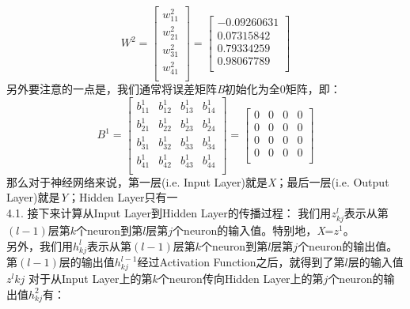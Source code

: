 \documentclass[a4paper,12pt,oneside]{book}
\begin{document}
\begin{equation*}
    W^2 = \begin{bmatrix}
        w^2_{11}\\
        w^2_{21}\\
        w^2_{31}\\
        w^2_{41}\\
    \end{bmatrix}
    = \begin{bmatrix}
        -0.09260631\\
        0.07315842\\
        0.79334259\\
        0.98067789\\
    \end{bmatrix}
\end{equation*}
另外要注意的一点是，我们通常将误差矩阵\textit{B}初始化为全0矩阵，即：
\begin{equation*}
    B^1 = \begin{bmatrix}
        b^1_{11} & b^1_{12} & b^1_{13} & b^1_{14} \\
        b^1_{21} & b^1_{22} & b^1_{23} & b^1_{24} \\
        b^1_{31} & b^1_{32} & b^1_{33} & b^1_{34} \\
        b^1_{41} & b^1_{42} & b^1_{43} & b^1_{44} \\
    \end{bmatrix}
    = \begin{bmatrix}
        0 & 0 & 0 & 0 \\
        0 & 0 & 0 & 0 \\
        0 & 0 & 0 & 0 \\
        0 & 0 & 0 & 0 \\
    \end{bmatrix}
\end{equation*}
那么对于神经网络来说，第一层(i.e. Input Layer)就是\textit{X}；最后一层(i.e. Output Layer)就是\textit{Y}；Hidden Layer只有一\\
4.1. 接下来计算从Input Layer到Hidden Layer的传播过程：
我们用$z^l_{kj}$表示从第$(l-1)$层第$k$个neuron到第$l$层第$j$个neuron的输入值。特别地，\textit{X}=$z^1$。\\
另外，我们用$h^l_{kj}$表示从第$(l-1)$层第$k$个neuron到第$l$层第$j$个neuron的输出值。\\
第$(l-1)$层的输出值$h^{l-1}_{kj}$经过Activation Function之后，就得到了第$l$层的输入值$z^l{kj}$
对于从Input Layer上的第$k$个neuron传向Hidden Layer上的第$j$个neuron的输出值$h^2_{kj}$有：\\
\end{document}
